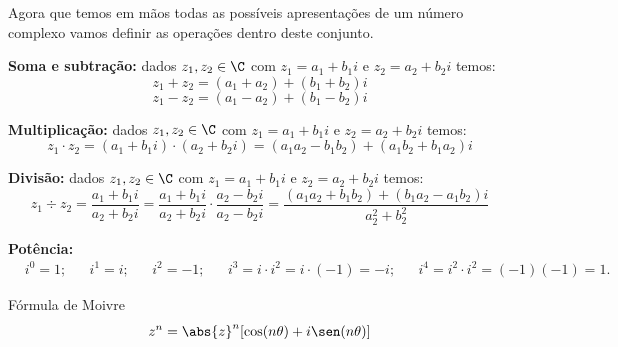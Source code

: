  Agora que temos em mãos todas as possíveis apresentações de um número complexo vamos definir as operações dentro deste conjunto.

 \textbf{Soma e subtração:} dados $z_1, z_2 \in \C$ com $z_1= a_1 + b_1i$ e $z_2= a_2 + b_2i$ temos:
 \[z_1 + z_2= (a_1 + a_2) + (b_1 + b_2)i \]
 \[z_1 - z_2= (a_1 - a_2) + (b_1 - b_2)i \]

 \textbf{Multiplicação:} dados $z_1, z_2 \in \C$ com $z_1= a_1 + b_1i$ e $z_2= a_2 + b_2i$ temos:
 \[z_1 \cdot z_2= (a_1 + b_1i) \cdot (a_2 + b_2i)= (a_1a_2 - b_1b_2) + (a_1b_2 + b_1a_2)i \]

 \textbf{Divisão:} dados $z_1, z_2 \in \C$ com $z_1= a_1 + b_1i$ e $z_2= a_2 + b_2i$ temos:
 \[z_1 \div z_2= \frac{a_1 + b_1i}{a_2 + b_2i}= \frac{a_1 + b_1i}{a_2 + b_2i} \cdot \frac{a_2 - b_2i}{a_2 - b_2i} = \frac{(a_1a_2 + b_1b_2) + (b_1a_2 - a_1b_2)i}{a_2^2 + b_2^2} \]

 \textbf{Potência:}
 \begin{align*}
 & i^0= 1 ;& & i^1= i; & & i^2= -1; & & i^3= i \cdot i^2= i \cdot (-1)= -i; & & i^4= i^2 \cdot i^2= (-1)(-1)= 1 .&
 \end{align*}

 Fórmula de Moivre
 \begin{equation}
  z^n= \abs{z}^n[\cos(n \theta) + i \sen(n \theta)]
 \end{equation}

 \newpage
